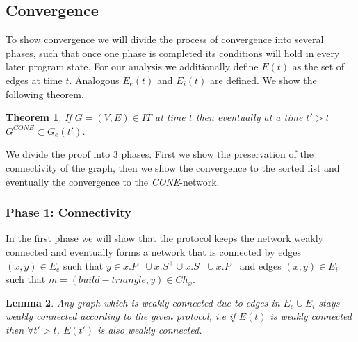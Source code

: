 \documentclass[11pt]{article}
\newtheorem{theorem}{Theorem}[section]
\newtheorem{lemma}[theorem]{Lemma}
\begin{document}
\subsection{Convergence}
To show convergence we will divide the process of convergence into several phases, such that once one phase is completed its conditions will hold in every later program state. For our analysis we additionally define $E(t)$ as the set of edges at time $t$. Analogous $E_e(t)$ and $E_i(t)$ are defined.
We show the following theorem. 

\begin{theorem}\label{theo:convergence}
If $G=(V,E) \in IT$ at time $t$ then eventually at a time $t'>t$ $G^{CONE}\subset G_e(t')$.
\end{theorem}

We divide the proof into 3 phases. First we show the preservation of the connectivity of the graph, then we show the convergence to the sorted list and eventually the convergence to the \emph{CONE}-network.

\subsubsection{Phase 1: Connectivity}
In the first phase we will show that the protocol keeps the network weakly connected and eventually forms a network that is connected by edges $(x,y)\in E_e$ such that $y\in x.P^+ \cup x.S^+ \cup x.S^- \cup x.P^-$ and edges $(x,y)\in E_i$ such that $m=(build-triangle,y) \in Ch_x$.

\begin{lemma}\label{lem:GConnectivity}
Any graph which is weakly connected due to edges in  $E_e \cup E_i$ stays weakly connected according to the given protocol, i.e if $E(t)$ is weakly connected then $\forall t'>t$, $E(t')$ is also weakly connected.
\end{lemma}
\end{document}
